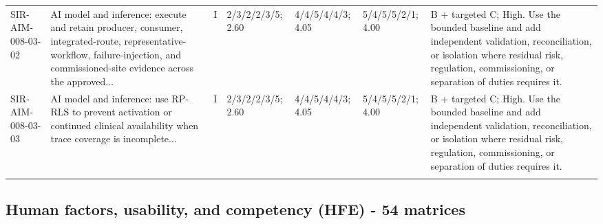 \documentclass[11pt,letterpaper]{article}
\begin{document}
\begin{scriptsize}
\begin{longtable}{@{}L{0.11\textwidth}L{0.165\textwidth}L{0.04\textwidth}L{0.115\textwidth}L{0.115\textwidth}L{0.115\textwidth}L{0.235\textwidth}@{}}
\addlinespace[2pt]
SIR-AIM-008-03-02 & AI model and inference: execute and retain producer, consumer, integrated-route, representative-workflow, failure-injection, and commissioned-site evidence across the approved... & I & 2/3/2/2/3/5; 2.60 & 4/4/5/4/4/3; 4.05 & 5/4/5/5/2/1; 4.00 & B + targeted C; High. Use the bounded baseline and add independent validation, reconciliation, or isolation where residual risk, regulation, commissioning, or separation of duties requires it. \\
\addlinespace[2pt]
SIR-AIM-008-03-03 & AI model and inference: use RP-RLS to prevent activation or continued clinical availability when trace coverage is incomplete... & I & 2/3/2/2/3/5; 2.60 & 4/4/5/4/4/3; 4.05 & 5/4/5/5/2/1; 4.00 & B + targeted C; High. Use the bounded baseline and add independent validation, reconciliation, or isolation where residual risk, regulation, commissioning, or separation of duties requires it. \\
\addlinespace[2pt]
\end{longtable}
\end{scriptsize}

\subsection{Human factors, usability, and competency (HFE) - 54 matrices}
\end{document}
